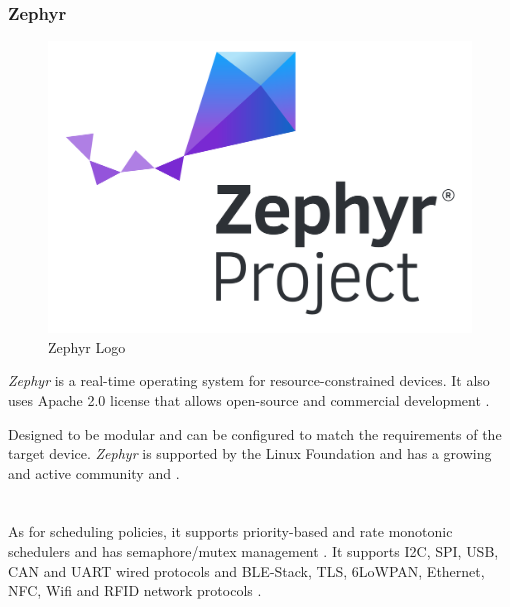 \subsubsection{Zephyr}
\begin{figure}
    \begin{center}
        \includegraphics[scale=0.25]{ch3/assets/zephyr.png}
    \end{center}
    \caption{Zephyr Logo}
\end{figure}
\textit{Zephyr} is a real-time operating system for resource-constrained devices.
It also uses Apache 2.0 license that allows open-source and commercial development \cite{zephyr}.

Designed to be modular and can be configured to match the requirements of the target device.
\textit{Zephyr} is supported by the Linux Foundation and has a growing and active community \cite{zephyr} and \cite{RTOS5}.
\\\\\\
As for scheduling policies, it supports priority-based and rate monotonic schedulers and has semaphore/mutex management \cite{compRTOS}.
It supports \gls{I2C}, \gls{SPI}, \gls{USB}, \gls{CAN} and \gls{UART} wired protocols and \gls{BLE}-Stack, \gls{TLS}, 6LoWPAN, Ethernet, \gls{NFC}, \gls{Wifi} and \gls{RFID} network protocols \cite{compRTOS} \cite{compRTOS}.

